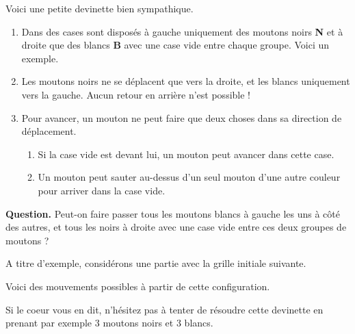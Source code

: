 Voici une petite devinette bien sympathique.

\begin{enumerate}
	\item Dans des cases sont disposés à gauche uniquement des moutons noirs \textbf{N} et à droite que des blancs \textbf{B} avec une case vide entre chaque groupe. Voici un exemple.


	\item Les moutons noirs ne se déplacent que vers la droite, et les blancs uniquement vers la gauche. Aucun retour en arrière n'est possible !


	\item Pour avancer, un mouton ne peut faire que deux choses dans sa direction de déplacement.
	\begin{enumerate}
		\item Si la case vide est devant lui, un mouton peut avancer dans cette case.

		\item Un mouton peut sauter au-dessus d'un seul mouton d'une autre couleur pour arriver dans la case vide.
	\end{enumerate}
\end{enumerate}

\textbf{Question.} Peut-on faire passer tous les moutons blancs à gauche les uns à côté des autres, et tous les noirs à droite avec une case vide entre ces deux groupes de moutons ?


\bigskip


A titre d'exemple, considérons une partie avec la grille initiale suivante.


Voici des mouvements possibles à partir de cette configuration.

\medskip

\begin{mvts}
	\item {}

	\medskip
	\item {}
		  
	\medskip
	\item {}
		  
	\medskip
	\item {}
		  
	\medskip
	\item {}
		  
	\medskip
	\item {}
\end{mvts}

Si le coeur vous en dit, n'hésitez pas à tenter de résoudre cette devinette en prenant par exemple $3$ moutons noirs et $3$ blancs.
